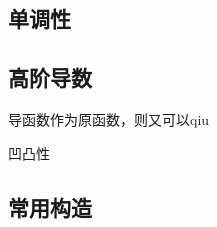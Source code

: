
\begin{issues}
\issueDraft
\end{issues}

\subsection{单调性}

\subsection{高阶导数}

导函数作为原函数，则又可以qiu

凹凸性
\subsection{常用构造}